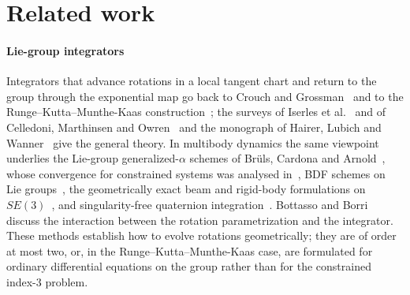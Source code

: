 \section{Related work}
\label{sec:related}

\paragraph{Lie-group integrators}
Integrators that advance rotations in a local tangent chart and return to the group through the
exponential map go back to Crouch and Grossman~\cite{crouch1993numerical} and to the
Runge--Kutta--Munthe-Kaas construction~\cite{munthe1998lie,munthe1999high}; the surveys of
Iserles et al.~\cite{iserles2000lie} and of Celledoni, Marthinsen and Owren~\cite{celledoni2014lie}
and the monograph of Hairer, Lubich and Wanner~\cite{hairer2006geometric} give the general theory.
In multibody dynamics the same viewpoint underlies the Lie-group generalized-$\alpha$ schemes of
Br\"uls, Cardona and Arnold~\cite{bruls2010lie,bruls2012lie}, whose convergence for constrained
systems was analysed in~\cite{arnold2007convergence,arnold2015error}, BDF schemes on Lie
groups~\cite{wieloch2021bdf}, the geometrically exact beam and rigid-body formulations on
$SE(3)$~\cite{sonneville2014geometrically}, and singularity-free quaternion
integration~\cite{terze2016singularity,terze2020aircraft}. Bottasso and Borri~\cite{bottasso1998integrating}
discuss the interaction between the rotation parametrization and the integrator. These methods
establish how to evolve rotations geometrically; they are of order at most two, or, in the
Runge--Kutta--Munthe-Kaas case, are formulated for ordinary differential equations on the group
rather than for the constrained index-3 problem.


